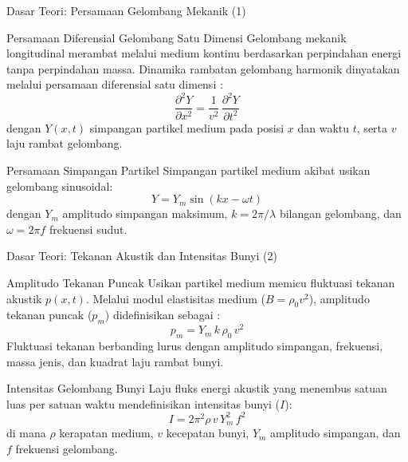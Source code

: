 \documentclass[aspectratio=169, 10pt]{beamer}
\begin{document}
	\begin{frame}{Dasar Teori: Persamaan Gelombang Mekanik (1)}
		\begin{block}{Persamaan Diferensial Gelombang Satu Dimensi}
			Gelombang mekanik longitudinal merambat melalui medium kontinu berdasarkan perpindahan energi tanpa perpindahan massa. Dinamika rambatan gelombang harmonik dinyatakan melalui persamaan diferensial satu dimensi \parencite{halliday2021}:
			\begin{equation}
				\frac{\partial^{2}Y}{\partial x^{2}} = \frac{1}{v^{2}}\,\frac{\partial^{2}Y}{\partial t^{2}}
			\end{equation}
			dengan $Y(x,t)$ simpangan partikel medium pada posisi $x$ dan waktu $t$, serta $v$ laju rambat gelombang.
		\end{block}

		\begin{block}{Persamaan Simpangan Partikel}
			Simpangan partikel medium akibat usikan gelombang sinusoidal:
			\begin{equation}
				Y = Y_{m}\sin(kx - \omega t)
			\end{equation}
			dengan $Y_{m}$ amplitudo simpangan maksimum, $k = 2\pi/\lambda$ bilangan gelombang, dan $\omega = 2\pi f$ frekuensi sudut.
		\end{block}
	\end{frame}

	\begin{frame}{Dasar Teori: Tekanan Akustik dan Intensitas Bunyi (2)}
		\begin{block}{Amplitudo Tekanan Puncak}
			Usikan partikel medium memicu fluktuasi tekanan akustik $p(x,t)$. Melalui modul elastisitas medium ($B=\rho_0 v^2$), amplitudo tekanan puncak ($p_m$) didefinisikan sebagai \parencite{halliday2021}:
			\begin{equation}
				p_{m} = Y_{m}\,k\,\rho_{0}\,v^{2}
			\end{equation}
			Fluktuasi tekanan berbanding lurus dengan amplitudo simpangan, frekuensi, massa jenis, dan kuadrat laju rambat bunyi.
		\end{block}

		\begin{block}{Intensitas Gelombang Bunyi}
			Laju fluks energi akustik yang menembus satuan luas per satuan waktu mendefinisikan intensitas bunyi ($I$):
			\begin{equation}
				I = 2\pi^{2}\rho\,v\,Y_{m}^{2}\,f^{2}
			\end{equation}
			di mana $\rho$ kerapatan medium, $v$ kecepatan bunyi, $Y_m$ amplitudo simpangan, dan $f$ frekuensi gelombang.
		\end{block}
	\end{frame}
\end{document}
